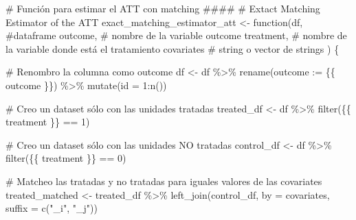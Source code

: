 \documentclass[
  letterpaper,
  DIV=11,
  numbers=noendperiod,
  oneside]{scrreprt}
\newenvironment{Shaded}{\begin{snugshade}}{\end{snugshade}}
\newcommand{\AttributeTok}[1]{\textcolor[rgb]{0.40,0.45,0.13}{#1}}
\newcommand{\CommentTok}[1]{\textcolor[rgb]{0.37,0.37,0.37}{#1}}
\newcommand{\ControlFlowTok}[1]{\textcolor[rgb]{0.00,0.23,0.31}{#1}}
\newcommand{\DecValTok}[1]{\textcolor[rgb]{0.68,0.00,0.00}{#1}}
\newcommand{\FunctionTok}[1]{\textcolor[rgb]{0.28,0.35,0.67}{#1}}
\newcommand{\NormalTok}[1]{\textcolor[rgb]{0.00,0.23,0.31}{#1}}
\newcommand{\OtherTok}[1]{\textcolor[rgb]{0.00,0.23,0.31}{#1}}
\newcommand{\SpecialCharTok}[1]{\textcolor[rgb]{0.37,0.37,0.37}{#1}}
\newcommand{\StringTok}[1]{\textcolor[rgb]{0.13,0.47,0.30}{#1}}
\begin{document}
\begin{Shaded}
\begin{Highlighting}[]
\CommentTok{\# Función para estimar el ATT con matching \#\#\#\#}
\CommentTok{\# Extact Matching Estimator of the ATT}
\NormalTok{exact\_matching\_estimator\_att }\OtherTok{\textless{}{-}} \ControlFlowTok{function}\NormalTok{(df, }\CommentTok{\#dataframe}
\NormalTok{                                         outcome, }\CommentTok{\# nombre de la variable outcome}
\NormalTok{                                         treatment, }\CommentTok{\# nombre de la variable donde está el tratamiento}
\NormalTok{                                         covariates }\CommentTok{\# string o vector de strings}
\NormalTok{) \{}
  
  \CommentTok{\# Renombro la columna como outcome}
\NormalTok{  df }\OtherTok{\textless{}{-}}\NormalTok{ df }\SpecialCharTok{\%\textgreater{}\%}
    \FunctionTok{rename}\NormalTok{(}\AttributeTok{outcome :=}\NormalTok{ \{\{ outcome \}\}) }\SpecialCharTok{\%\textgreater{}\%} 
    \FunctionTok{mutate}\NormalTok{(}\AttributeTok{id =} \DecValTok{1}\SpecialCharTok{:}\FunctionTok{n}\NormalTok{())}
  
  \CommentTok{\# Creo un dataset sólo con las unidades tratadas}
\NormalTok{  treated\_df }\OtherTok{\textless{}{-}}\NormalTok{ df }\SpecialCharTok{\%\textgreater{}\%} 
    \FunctionTok{filter}\NormalTok{(\{\{ treatment \}\} }\SpecialCharTok{==} \DecValTok{1}\NormalTok{)}
  
  \CommentTok{\# Creo un dataset sólo con las unidades NO tratadas}
\NormalTok{  control\_df }\OtherTok{\textless{}{-}}\NormalTok{ df }\SpecialCharTok{\%\textgreater{}\%} 
    \FunctionTok{filter}\NormalTok{(\{\{ treatment \}\} }\SpecialCharTok{==} \DecValTok{0}\NormalTok{)}
  
  \CommentTok{\# Matcheo las tratadas y no tratadas para iguales valores de las covariates}
\NormalTok{  treated\_matched }\OtherTok{\textless{}{-}}\NormalTok{ treated\_df }\SpecialCharTok{\%\textgreater{}\%} 
    \FunctionTok{left\_join}\NormalTok{(control\_df, }\AttributeTok{by =}\NormalTok{ covariates,}
              \AttributeTok{suffix =} \FunctionTok{c}\NormalTok{(}\StringTok{"\_i"}\NormalTok{, }\StringTok{"\_j"}\NormalTok{))}
  

\end{Highlighting}
\end{Shaded}
\end{document}
